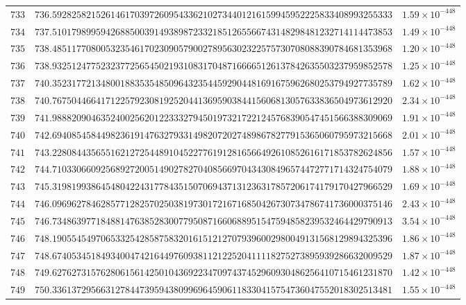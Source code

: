 \documentclass[12pt,reqno]{amsart}
\theoremstyle{remark}
\begin{document}
\begin{longtable}{clc}
$733$ & $736.5928258215261461703972609543362102734401216159945952225833408993255333$ & $1.59\times 10^{-448}$ \\
$734$ & $737.5101798995942688500391493898723321851265566743148298481232714114473853$ & $1.49\times 10^{-448}$ \\
$735$ & $738.4851177080053235461702309057900278956302322575730708088390784681353968$ & $1.20\times 10^{-448}$ \\
$736$ & $738.9325124775232377256545021931083170487166665126137842635503237959852578$ & $1.25\times 10^{-448}$ \\
$737$ & $740.3523177213480018835354850964323544592904481691675962680253794927735789$ & $1.62\times 10^{-448}$ \\
$738$ & $740.7675044664171225792308192520441369590384415606813057633836504973612920$ & $2.34\times 10^{-448}$ \\
$739$ & $741.9888209046352400256201223332794501973217221245768390547451566388309069$ & $1.91\times 10^{-448}$ \\
$740$ & $742.6940854584498236191476327933149820720274898678277915365060795973215668$ & $2.01\times 10^{-448}$ \\
$741$ & $743.2280844356551621272544891045227761912816566492610852616171853782624856$ & $1.57\times 10^{-448}$ \\
$742$ & $744.7103306609256892720051490278270408566970434308496574472771714324754079$ & $1.88\times 10^{-448}$ \\
$743$ & $745.3198199386454804224317784351507069437131236317857206174179170427966529$ & $1.69\times 10^{-448}$ \\
$744$ & $746.0969627846285771282570250381973017216716850426730734786741736000375146$ & $2.43\times 10^{-448}$ \\
$745$ & $746.7348639771848814763852830077950871660688951547594858239532464429790913$ & $3.54\times 10^{-448}$ \\
$746$ & $748.1905545497065332542858758320161512127079396002980049131568129894325396$ & $1.86\times 10^{-448}$ \\
$747$ & $748.6740534518493400474216449760938112122520411118275273895939286632009529$ & $1.87\times 10^{-448}$ \\
$748$ & $749.6276273157628061561425010436922347097437452960930486256410715461231870$ & $1.42\times 10^{-448}$ \\
$749$ & $750.3361372956631278447395943809969645906118330415754736047552018302513481$ & $1.55\times 10^{-448}$ \\

\end{longtable}
\end{document}

